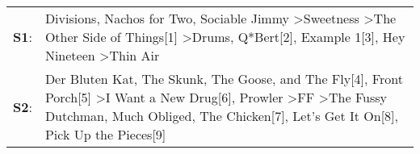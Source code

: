 \begin{supertabular}{p{0.03\textwidth}p{0.92\textwidth}}
 \textbf{S1}:  &                                                                            Divisions\textsuperscript{}, \enspace Nachos for Two\textsuperscript{}, \enspace Sociable Jimmy\textsuperscript{} \textgreater \enspace Sweetness\textsuperscript{} \textgreater \enspace The Other Side of Things[1]\textsuperscript{} \textgreater \enspace Drums\textsuperscript{}, \enspace Q*Bert[2]\textsuperscript{}, \enspace Example 1[3]\textsuperscript{}, \enspace Hey Nineteen\textsuperscript{} \textgreater \enspace Thin Air\textsuperscript{}  \enspace  \\
 \textbf{S2}:  &  Der Bluten Kat\textsuperscript{}, \enspace The Skunk, The Goose, and The Fly[4]\textsuperscript{}, \enspace Front Porch[5]\textsuperscript{} \textgreater \enspace I Want a New Drug[6]\textsuperscript{}, \enspace Prowler\textsuperscript{} \textgreater \enspace FF\textsuperscript{} \textgreater \enspace The Fussy Dutchman\textsuperscript{}, \enspace Much Obliged\textsuperscript{}, \enspace The Chicken[7]\textsuperscript{}, \enspace Let's Get It On[8]\textsuperscript{}, \enspace Pick Up the Pieces[9]\textsuperscript{}  \enspace  \\
\end{supertabular}
